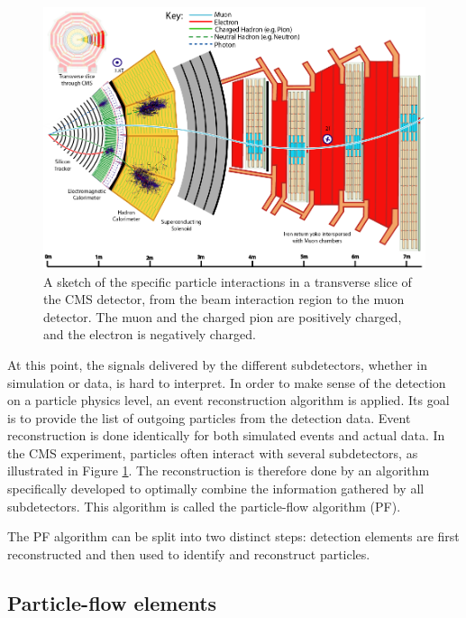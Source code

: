 \begin{figure}
    \centering
    \includegraphics[width=\textwidth]{Images/pflow_illustration_2.png}
    \caption{A sketch of the specific particle interactions in a transverse slice of the CMS detector, from the beam interaction region to the muon detector.  The muon and the charged pion are positively charged, and the electron is negatively charged.}
    \label{fig:pflow_illustration}
\end{figure}

At this point, the signals delivered by the different subdetectors, whether in simulation or data, is hard to interpret. In order to make sense of the detection on a particle physics level, an event reconstruction algorithm is applied. Its goal is to provide the list of outgoing particles from the detection data. Event reconstruction is done identically for both simulated events and actual data. In the CMS experiment, particles often interact with several subdetectors, as illustrated in Figure \ref{fig:pflow_illustration}. The reconstruction is therefore done by an algorithm specifically developed to optimally combine the information gathered by all subdetectors. This algorithm is called the particle-flow algorithm (PF). 

\label{sec:pf}

The PF algorithm can be split into two distinct steps: detection elements are first reconstructed and then used to identify and reconstruct particles.

\subsection{Particle-flow elements}

